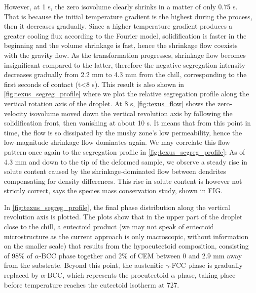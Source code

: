 However, at 1 s, the zero isovolume clearly shrinks in a matter of only 0.75 s. That is
because the initial temperature gradient is the highest during the process, then it decreases gradually. 
Since a higher temperature gradient produces a greater cooling flux according to the Fourier model, solidification is faster
in the beginning and the volume shrinkage is fast, hence the shrinkage flow coexists with the gravity flow. As the transformation
progresses, shrinkage flow becomes insignificant compared to the latter, therefore the negative segregation intensity decreases gradually from 2.2 mm
to 4.3 mm from the chill, corresponding to the first seconds of contact (t<8 s).
This result is also shown in \cref{fig:texus_segreg_profile} where we plot the relative segregation profile along the vertical rotation axis of the droplet.
At 8 s, \cref{fig:texus_flow} shows the zero-velocity isovolume moved down the vertical revolution axis by following
the solidification front, then vanishing at about 10 s. It means that from this point in time, the flow is so dissipated by the mushy zone's low permeability,
hence the low-magnitude shrinkage flow dominates again.
We may correlate this flow pattern once again to the segregation profile in \cref{fig:texus_segreg_profile}:
As of 4.3 mm and down to the tip of the deformed sample, we observe a steady rise in solute content caused 
by the shrinkage-dominated flow between dendrites compensating for density differences. 
This rise in solute content is however not strictly correct, says the species mass conservation study, shown in FIG.

In \cref{fig:texus_segreg_profile}, the final phase distribution along the vertical revolution axis is plotted.
The plots show that in the upper part of the droplet close to the chill, a eutectoid product (we may not speak of eutectoid microstructure as the current approach is only macroscopic, without
information on the smaller scale) that results from the hypoeutectoid composition, consisting of 98\% of $\alpha$-BCC phase together and 2\% of CEM between 0 and 2.9 mm away from the substrate.
Beyond this point, the austenitic $\gamma$-FCC phase is gradually replaced by $\alpha$-BCC, which represents the proeutectoid $\alpha$ phase, taking place before temperature
reaches the eutectoid isotherm at \SI{727}{\udegC}.

